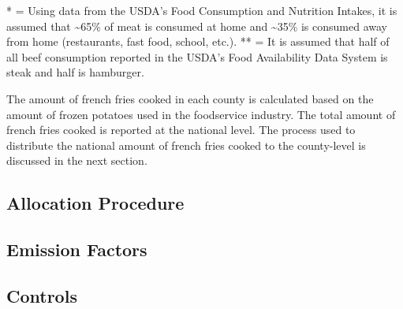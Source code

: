 \documentclass[
  11pt,
  oneside]{book}
\begin{document}
\begin{table}[H]
\centering
\caption{\label{tab:scale-factor}Scale Factor Derivation}
\centering
{}
\end{table}

\noindent
* = Using data from the USDA's Food Consumption and Nutrition Intakes, it is assumed that \textasciitilde65\% of meat is consumed at home and \textasciitilde35\% is consumed away from home (restaurants, fast food, school, etc.).
** = It is assumed that half of all beef consumption reported in the USDA's Food Availability Data System is steak and half is hamburger.

The amount of french fries cooked in each county is calculated based on the amount of frozen potatoes used in the foodservice industry. The total amount of french fries cooked is reported at the national level. The process used to distribute the national amount of french fries cooked to the county-level is discussed in the next section.

\subsection{Allocation Procedure}\label{allocation-procedure}

\subsection{Emission Factors}\label{emission-factors}

\subsection{Controls}\label{controls}
\end{document}
